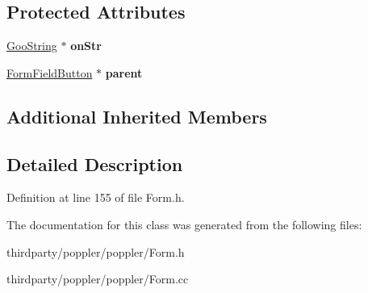 \subsection*{Protected Attributes}
\begin{DoxyCompactItemize}
\item 
\mbox{\label{class_form_widget_button_acdd24486986a52c7b6a7a55146c210ab}} 
\hyperlink{class_goo_string}{Goo\+String} $\ast$ {\bfseries on\+Str}
\item 
\mbox{\label{class_form_widget_button_a4814fb9d78524f084cb979e61c8ea2ad}} 
\hyperlink{class_form_field_button}{Form\+Field\+Button} $\ast$ {\bfseries parent}
\end{DoxyCompactItemize}
\subsection*{Additional Inherited Members}


\subsection{Detailed Description}


Definition at line 155 of file Form.\+h.



The documentation for this class was generated from the following files\+:\begin{DoxyCompactItemize}
\item 
thirdparty/poppler/poppler/Form.\+h\item 
thirdparty/poppler/poppler/Form.\+cc\end{DoxyCompactItemize}

